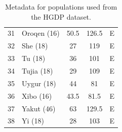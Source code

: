 \begin{table}
\begin{center}
{\begin{tabular}{r@{--}lccc}
31 & Oroqen (16) & 50.5 & 126.5 & E \\ 
32 & She (18) & 27 & 119 & E \\ 
33 & Tu (18) & 36 & 101 & E \\ 
34 & Tujia (18) & 29 & 109 & E \\ 
35 & Uygur (18) & 44 & 81 & E \\ 
36 & Xibo (16) & 43.5 & 81.5 & E \\ 
37 & Yakut (46) & 63 & 129.5 & E \\ 
38 & Yi (18) & 28 & 103 & E \\ 
   \hline
\end{tabular}
}
\label{tab:hgdp_popdata}
\end{center}
\caption{Metadata for populations used from the HGDP dataset.}
\end{table}
